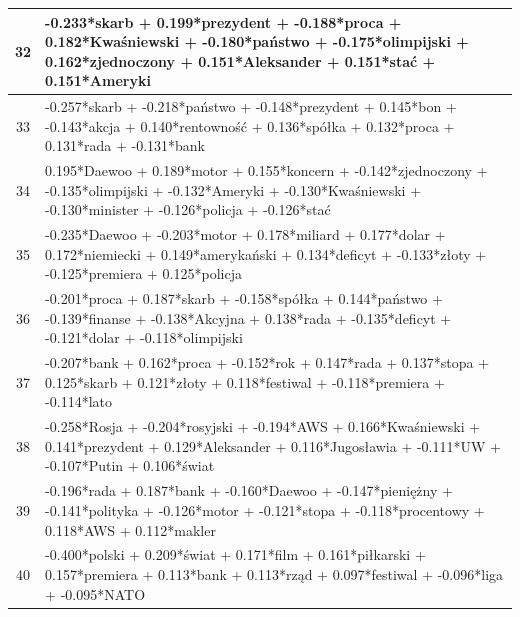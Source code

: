 \documentclass[11pt,a4paper]{article}
\begin{document}
\begin{table}[h]
\begin{tabular}{|c|>{\footnotesize}p{\linewidth}|}
32 & -0.233*skarb + 0.199*prezydent + -0.188*proca + 0.182*Kwaśniewski + -0.180*państwo + -0.175*olimpijski + 0.162*zjednoczony + 0.151*Aleksander + 0.151*stać + 0.151*Ameryki\\\hline
33 & -0.257*skarb + -0.218*państwo + -0.148*prezydent + 0.145*bon + -0.143*akcja + 0.140*rentowność + 0.136*spółka + 0.132*proca + 0.131*rada + -0.131*bank\\\hline
34 & 0.195*Daewoo + 0.189*motor + 0.155*koncern + -0.142*zjednoczony + -0.135*olimpijski + -0.132*Ameryki + -0.130*Kwaśniewski + -0.130*minister + -0.126*policja + -0.126*stać\\\hline
35 & -0.235*Daewoo + -0.203*motor + 0.178*miliard + 0.177*dolar + 0.172*niemiecki + 0.149*amerykański + 0.134*deficyt + -0.133*złoty + -0.125*premiera + 0.125*policja\\\hline
36 & -0.201*proca + 0.187*skarb + -0.158*spółka + 0.144*państwo + -0.139*finanse + -0.138*Akcyjna + 0.138*rada + -0.135*deficyt + -0.121*dolar + -0.118*olimpijski\\\hline
37 & -0.207*bank + 0.162*proca + -0.152*rok + 0.147*rada + 0.137*stopa + 0.125*skarb + 0.121*złoty + 0.118*festiwal + -0.118*premiera + -0.114*lato\\\hline
38 & -0.258*Rosja + -0.204*rosyjski + -0.194*AWS + 0.166*Kwaśniewski + 0.141*prezydent + 0.129*Aleksander + 0.116*Jugosławia + -0.111*UW + -0.107*Putin + 0.106*świat\\\hline
39 & -0.196*rada + 0.187*bank + -0.160*Daewoo + -0.147*pieniężny + -0.141*polityka + -0.126*motor + -0.121*stopa + -0.118*procentowy + 0.118*AWS + 0.112*makler\\\hline
40 & -0.400*polski + 0.209*świat + 0.171*film + 0.161*piłkarski + 0.157*premiera + 0.113*bank + 0.113*rząd + 0.097*festiwal + -0.096*liga + -0.095*NATO\\\hline

\end{tabular}
\end{table}
\end{document}
